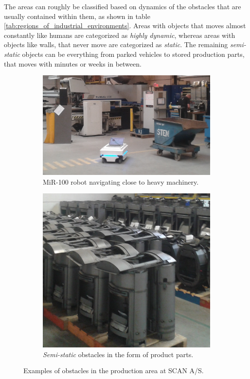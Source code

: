The areas can roughly be classified based on dynamics of the obstacles that are usually contained within them, as shown in table \ref{tab:regions_of_industrial_environments}. Areas with objects that moves almost constantly like humans are categorized as \textit{highly dynamic}, whereas areas with objects like walls, that never move are categorized as \textit{static}. The remaining \textit{semi-static} objects can be everything from parked vehicles to stored production parts, that moves with minutes or weeks in between. 

\begin{figure}[htbp]
	\centering
	\begin{subfigure}[t]{0.6\textwidth}
		\includegraphics[width=1.0\textwidth]{chapters/mapping_of_dynamic_areas/figures/scan-mir}	
		\caption{MiR-100 robot navigating close to heavy machinery.}
		\label{fig:scan-mir}
	\end{subfigure}
	\begin{subfigure}[t]{0.3875\textwidth}
		\includegraphics[width=1.0\textwidth]{chapters/mapping_of_dynamic_areas/figures/scan-semi-static-obstacles}
		\caption{\textit{Semi-static} obstacles in the form of product parts.}
		\label{fig:scan-semi-static-obstacles}
	\end{subfigure}
	\caption{Examples of obstacles in the production area at SCAN A/S.}
\end{figure}

